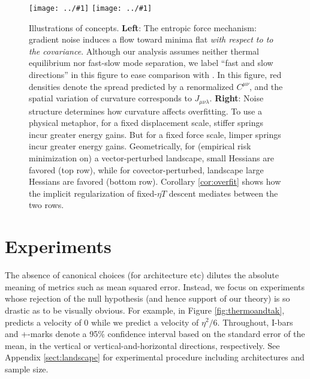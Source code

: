 \documentclass{article}
\theoremstyle{plain}
\theoremstyle{definition}
\newcommand{\plotmooh}[3]{\texttt{[image: ../\#1]}}
\begin{document}
        \begin{figure}[h!]
            \centering
            \plotmooh{diagrams/entropic-force-diagram}{}{0.32\columnwidth} 
            \plotmooh{diagrams/sharp}{}{0.31\columnwidth}
            \caption{
                Illustrations of concepts.
                {\bf Left}:
                    The entropic force mechanism: gradient noise induces a flow
                    toward minima flat \emph{with respect to to the
                    covariance}.  Although our analysis assumes neither thermal
                    equilibrium nor fast-slow mode separation, we label ``fast
                    and slow directions'' in this figure to ease comparison
                    with \citet{we19b}.  In this figure, red densities denote
                    the spread predicted by a renormalized $C^{\mu\nu}$, and
                    the spatial variation of curvature corresponds to
                    $J_{\mu\nu\lambda}$. 
                {\bf Right}:
                    Noise structure determines how curvature affects
                    overfitting.  To use a physical metaphor, for a fixed
                    displacement scale, stiffer springs incur greater energy
                    gains.  But for a fixed force scale, limper springs incur
                    greater energy gains.  Geometrically, for (empirical risk
                    minimization on) a vector-perturbed landscape, small
                    Hessians are favored (top row), while for
                    covector-perturbed, landscape large Hessians are favored
                    (bottom row).  Corollary \ref{cor:overfit} shows how the
                    implicit regularization of fixed-$\eta T$ descent mediates
                    between the two rows.
            }
            \label{fig:cubicandspring}
        \end{figure}


\section{Experiments}

    The absence of canonical choices (for architecture etc) dilutes the
    absolute meaning of metrics such as mean squared error.  Instead, we focus
    on experiments whose rejection of the null hypothesis (and hence support of
    our theory) is so drastic as to be visually obvious.  For example, in
    Figure \ref{fig:thermoandtak}, \citep{ch18} predicts a velocity of $0$
    while we predict a velocity of $\eta^2/6$.  
    Throughout, I-bars and +-marks denote a 95\% confidence interval based
    on the standard error of the mean, in the vertical or
    vertical-and-horizontal directions, respectively.
    See Appendix \ref{sect:landscape}
    for experimental procedure including architectures and sample size.
\end{document}
